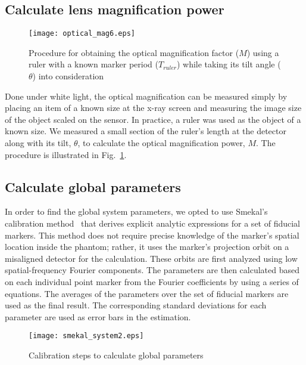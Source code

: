 \subsection{Calculate lens magnification power}
\begin{figure}[ht]
\centering
\texttt{[image: optical\_mag6.eps]}
\caption{Procedure for obtaining the optical magnification factor ($M$) using a ruler with a known marker period ($T_{ruler}$) while taking its tilt angle ($\theta$) into consideration}
\label{fig:optical_mag}
\end{figure}
Done under white light, the optical magnification can be measured simply by placing an item of a known size at the x-ray screen and measuring the image size of the object scaled on the sensor.  In practice, a ruler was used as the object of a known size. We measured a small section of the ruler's length at the detector along with its tilt, $\theta$, to calculate the optical magnification power, $M$.  The procedure is illustrated in Fig.~\ref{fig:optical_mag}.
\subsection{Calculate global parameters}

In order to find the global system parameters, we opted to use Smekal's calibration method~\citep{Smekal2004} that derives explicit analytic expressions for a set of fiducial markers.  This method does not require precise knowledge of the marker's spatial location inside the phantom; rather, it uses the marker's projection orbit on a misaligned detector for the calculation.  These orbits are first analyzed using low spatial-frequency Fourier components.  The parameters are then calculated based on each individual point marker from the Fourier coefficients by using a series of equations.  The averages of the parameters over the set of fiducial markers are used as the final result.  The corresponding standard deviations for each parameter are used as error bars in the estimation.
%
\begin{figure}[ht]
\texttt{[image: smekal\_system2.eps]}
\caption{Calibration steps to calculate global parameters}
\label{fig:smekal_method}
\end{figure}

